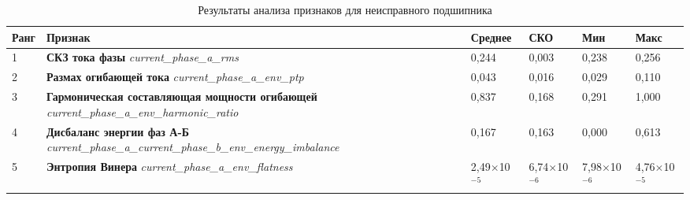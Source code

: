 \begin{table}[htbp]
\centering
\caption{Результаты анализа признаков для неисправного подшипника}
\label{tab:faulty_bearing_features}
\begin{tabular}{p{1cm} p{6cm} p{1.5cm} p{1.5cm} p{1.5cm} p{1.5cm}}
\toprule
\textbf{Ранг} & 
\textbf{Признак} &
\textbf{Среднее} & 
\textbf{СКО} &
\textbf{Мин} &
\textbf{Макс} \\
\midrule

1 & 
\textbf{СКЗ тока фазы} \newline
\textit{current\_phase\_a\_rms} & 
0,244 & 0,003 & 0,238 & 0,256 \\
\midrule

2 & 
\textbf{Размах огибающей тока} \newline
\textit{current\_phase\_a\_env\_ptp} & 
0,043 & 0,016 & 0,029 & 0,110 \\
\midrule

3 & 
\textbf{Гармоническая составляющая мощности огибающей} \newline
\textit{current\_phase\_a\_env\_harmonic\_ratio} & 
0,837 & 0,168 & 0,291 & 1,000 \\
\midrule

4 & 
\textbf{Дисбаланс энергии фаз А-Б} \newline
\textit{current\_phase\_a\_current\_phase\_b\_env\_energy\_imbalance} & 
0,167 & 0,163 & 0,000 & 0,613 \\
\midrule

5 & 
\textbf{Энтропия Винера} \newline
\textit{current\_phase\_a\_env\_flatness} & 
2,49$\times$10$^{-5}$ & 6,74$\times$10$^{-6}$ & 7,98$\times$10$^{-6}$ & 4,76$\times$10$^{-5}$ \\

\bottomrule
\end{tabular}
\end{table}

